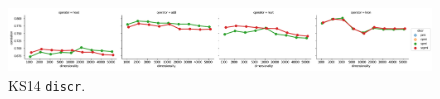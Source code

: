 \begin{figure}[b]
  \centering

  \includegraphics[width=1.1\textwidth]{supplement/figures/ks14-interaction-discr}

  \caption{KS14 \texttt{discr}.}
  \label{fig:ks14-discr}
\end{figure}
